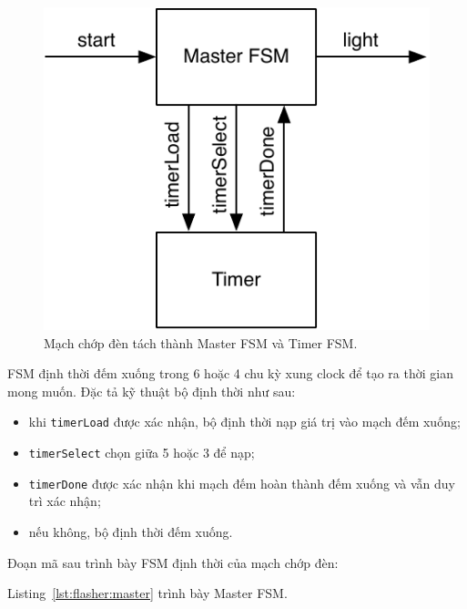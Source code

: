 \documentclass[%
    10pt,
    headinclude, footexclude,
    openright, %
    notitlepage,
    cleardoubleempty,
    headsepline,
    pointlessnumbers,
    bibtotoc, idxtotoc,
    ]{scrbook}
\newcommand{\code}[1]{{\small{\texttt{#1}}}}
\newcommand{\scale}{0.7}
\begin{document}
\begin{figure}
  \centering
  \includegraphics[scale=\scale]{figures/flasher}
  \caption{Mạch chớp đèn tách thành Master FSM và Timer FSM.}
  \label{fig:flasher}
\end{figure}

FSM định thời đếm xuống trong 6 hoặc 4 chu kỳ xung clock để tạo ra thời gian mong muốn. Đặc tả kỹ thuật bộ định thời như sau: 

\begin{itemize}
\item khi \code{timerLoad} được xác nhận, bộ định thời nạp giá trị vào mạch đếm xuống;
\item \code{timerSelect} chọn giữa 5 hoặc 3 để nạp;
\item \code{timerDone} được xác nhận khi mạch đếm hoàn thành đếm xuống và vẫn duy trì xác nhận;
\item nếu không, bộ định thời đếm xuống.
\end{itemize}

\noindent Đoạn mã sau trình bày FSM định thời của mạch chớp đèn:


\noindent Listing~\ref{lst:flasher:master} trình bày Master FSM.

\end{document}
